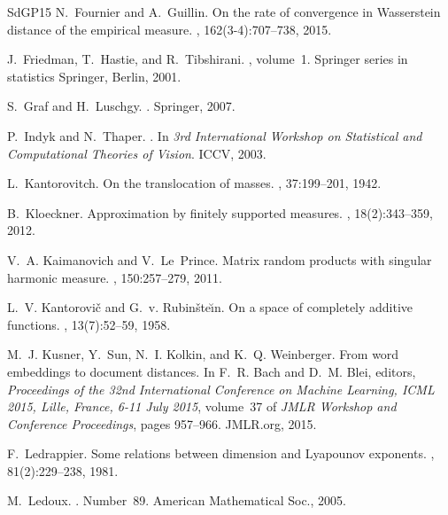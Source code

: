 \documentclass[sts]{imsart}
\begin{document}
\begin{thebibliography}{SdGP{\etalchar{+}}15}
N.~Fournier and A.~Guillin.
\newblock On the rate of convergence in {W}asserstein distance of the empirical
  measure.
, 162(3-4):707--738, 2015.

J.~Friedman, T.~Hastie, and R.~Tibshirani.
, volume~1.
\newblock Springer series in statistics Springer, Berlin, 2001.

S.~Graf and H.~Luschgy.
.
\newblock Springer, 2007.

P.~Indyk and N.~Thaper.
.
\newblock In {\em 3rd International Workshop on Statistical and Computational
  Theories of Vision}. ICCV, 2003.

L.~Kantorovitch.
\newblock On the translocation of masses.
, 37:199--201, 1942.

B.~Kloeckner.
\newblock Approximation by finitely supported measures.
, 18(2):343--359, 2012.

V.~A. Kaimanovich and V.~Le~Prince.
\newblock Matrix random products with singular harmonic measure.
, 150:257--279, 2011.

L.~V. Kantorovi\v{c} and G.~v. Rubin\v{s}te\u\i{n}.
\newblock On a space of completely additive functions.
, 13(7):52--59, 1958.

M.~J. Kusner, Y.~Sun, N.~I. Kolkin, and K.~Q. Weinberger.
\newblock From word embeddings to document distances.
\newblock In F.~R. Bach and D.~M. Blei, editors, {\em Proceedings of the 32nd
  International Conference on Machine Learning, {ICML} 2015, Lille, France,
  6-11 July 2015}, volume~37 of {\em {JMLR} Workshop and Conference
  Proceedings}, pages 957--966. JMLR.org, 2015.

F.~Ledrappier.
\newblock Some relations between dimension and {L}yapounov exponents.
, 81(2):229--238, 1981.

M.~Ledoux.
.
\newblock Number~89. American Mathematical Soc., 2005.


\end{thebibliography}
\end{document}
